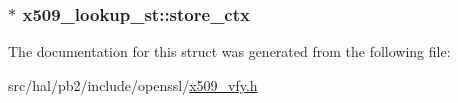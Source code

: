 \subsubsection[{\texorpdfstring{store\+\_\+ctx}{store_ctx}}]{$\ast$ x509\+\_\+lookup\+\_\+st\+::store\+\_\+ctx}\hypertarget{structx509__lookup__st_a91fff2cdf32522eb0b037bdb9cdf2e53}{}\label{structx509__lookup__st_a91fff2cdf32522eb0b037bdb9cdf2e53}


The documentation for this struct was generated from the following file\+:\begin{DoxyCompactItemize}
\item 
src/hal/pb2/include/openssl/\hyperlink{x509__vfy_8h}{x509\+\_\+vfy.\+h}\end{DoxyCompactItemize}
